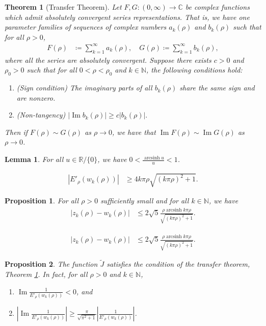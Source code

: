 \documentclass[10pt,a4paper]{amsart}
\newtheorem{theorem}{Theorem}
\newtheorem{lemma}{Lemma}
\newtheorem{prop}{Proposition}
\newcommand{\C}{\mathbb{C}}
\DeclareMathOperator{\Imz}{Im}
\newcommand{\N}{\mathbb{N}}
\newcommand{\R}{\mathbb{R}}
\DeclareMathOperator{\arcsinh}{arcsinh}
\begin{document}
\begin{theorem}[Transfer Theorem] \label{transferthm}
    Let $F,G: (0,\infty) \to \C$ be complex functions which admit absolutely convergent series representations. That is, we have one parameter families of sequences of complex numbers $a_k(\rho)$ and $b_k(\rho)$ such that for all $\rho > 0$,
     \begin{align*}
    F(\rho) &\coloneq \sum_{k=1}^{\infty} a_k(\rho), \quad
    G(\rho) \coloneq \sum_{k=1}^{\infty} b_k(\rho),
\end{align*}
where all the series are absolutely convergent. Suppose there exists $c>0$ and $\rho_0 > 0$ such that for all $0 < \rho < \rho_0$ and $k \in \N$, the following conditions hold:
\begin{enumerate}
    \item (Sign condition) The imaginary parts of all $b_k(\rho)$ share the same sign and are nonzero.
    \item (Non-tangency) $\left| \Imz b_k(\rho) \right| \geq c|b_k(\rho)|.$
\end{enumerate}
Then if $F(\rho) \sim G(\rho)$ as $\rho \to 0$, we have that $\Imz F(\rho) \sim \Imz G(\rho)$ as $\rho \to 0$.
\end{theorem}

\begin{lemma}\label{arcsinhu_overu}
For all $u \in \R / \{0\}$, we have $0 < \frac{\arcsinh u}{u} < 1$.
\end{lemma}

\begin{align}
\left| E'_\rho(w_k(\rho)) \right| &\geq 4k\pi\rho \sqrt{(k\pi\rho)^2 + 1}.    \label{derho_wk_lowerbound}
\end{align}

\begin{prop}\label{zkrk_bound_thm}
    For all $\rho > 0$ sufficiently small and for all $k \in \N$, we have
    \begin{align}
        |z_k(\rho) - w_k(\rho)| &\leq 2\sqrt{5} \frac{\rho \arcsinh k\pi\rho}{\sqrt{(k\pi\rho)^2 + 1}}. \label{zkrk_bound}
    \end{align}
\end{prop}

    \begin{align}
        |z_k(\rho) - w_k(\rho)| &\leq 2\sqrt{5} \frac{\rho \arcsinh k\pi\rho}{\sqrt{(k\pi\rho)^2 + 1}}. 
    \end{align}

\begin{prop}\label{jtildetransferthm}
The function $\tilde{J}$ satisfies the condition of the transfer theorem, Theorem \ref{transferthm}. In fact, for all $\rho > 0$ and $k \in \N$,
\begin{enumerate}
    \item $\Imz \frac{1}{E'_\rho(w_k(\rho))} < 0$, and
    \item $\left| \Imz \frac{1}{E'_\rho(w_k(\rho))} \right| \geq \frac{\pi}{\sqrt{\pi^2 + 1}} \left| \frac{1}{E'_\rho(w_k(\rho))} \right|$.
\end{enumerate}  
\end{prop}
\end{document}
